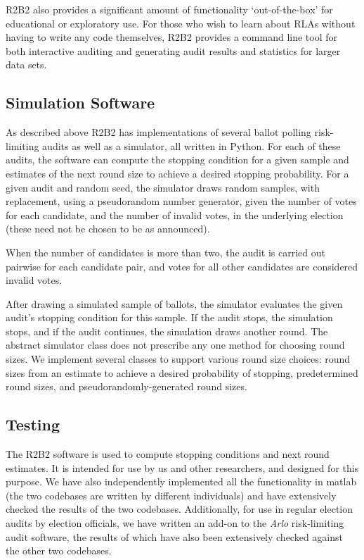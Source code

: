
R2B2 also provides a significant amount of functionality `out-of-the-box' for educational
or exploratory use. For those who wish to learn about RLAs without having to write any
code themselves, R2B2 provides a command line tool for both interactive auditing and
generating audit results and statistics for larger data sets.

\subsection{Simulation Software}
As described above R2B2 has implementations of several ballot polling risk-limiting audits as well as a simulator, 
all written in Python.
For each of these audits, the software can compute the stopping condition for a given sample and estimates
of the next round size to achieve a desired stopping probability. 
For a given audit and random seed, the simulator draws random samples, with replacement, using a pseudorandom number generator, given the number of votes for each candidate, and the number of invalid votes, in the underlying election (these need not be chosen to be as announced). 

When the number of candidates is more than two, the audit is carried out pairwise for each candidate pair, and votes for all other candidates are considered invalid votes. 

After drawing a simulated sample of ballots, the simulator evaluates the given audit's stopping condition for this sample.
If the audit stops, the simulation stops, and if the audit continues, the simulation draws another round. 
The abstract simulator class does not prescribe any one method for choosing round sizes. 
We implement several classes to support various round size choices: 
round sizes from an estimate to achieve a desired probability of stopping, 
predetermined round sizes, and pseudorandomly-generated round sizes. 

\subsection{Testing}

The R2B2 software is used to compute stopping conditions and next round estimates. It is intended for use by us and other researchers, and designed for this purpose. We have also independently implemented all the functionality in matlab \cite{brla_explore_anon} (the two codebases are written by different individuals) and have extensively checked the results of the two codebases. Additionally, for use in regular election audits by election officials, we have written an add-on \cite{athena_anon} to the {\em Arlo} risk-limiting audit software, the results of which have also been extensively checked against the other two codebases. 


